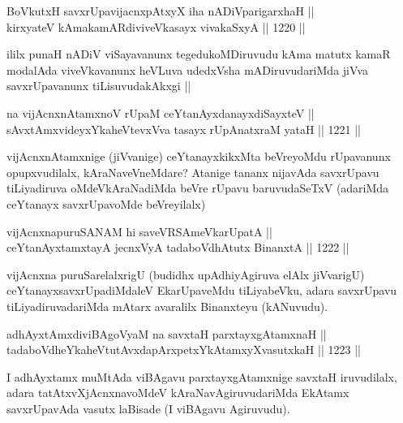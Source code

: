 
\begin{shl}
BoVkutxH savxrUpavijacnxpAtxyX iha nADiVparigarxhaH || \\
kirxyateV kAmakamARdiviveVkasayx vivakaSxyA \hfill || 1220 ||  
\end{shl}

\begin{artha}
ililx punaH nADiV viSayavanunx tegedukoMDiruvudu kAma matutx kamaR modalAda viveVkavanunx heVLuva udedxVsha mADiruvudariMda jiVva savxrUpavanunx tiLisuvudakAkxgi ||
\end{artha}


\begin{shl}
na vijAcnxnAtamxnoV rUpaM ceYtanAyxdanayxdiSayxteV || \\
sAvxtAmxvideyxYkaheVtevxVva tasayx rUpAnatxraM yataH \hfill || 1221 ||  
\end{shl}

\begin{artha}
vijAcnxnAtamxnige (jiVvanige) ceYtanayxkikxMta beVreyoMdu rUpavanunx opupxvudilalx, kAraNaveVneMdare? Atanige tananx nijavAda savxrUpavu tiLiyadiruva oMdeVkAraNadiMda beVre rUpavu baruvudaSeTxV (adariMda ceYtanayx savxrUpavoMde beVreyilalx)
\end{artha}

\begin{shl}
vijAcnxnapuruSANAM hi saveVRSAmeVkarUpatA || \\
ceYtanAyxtamxtayA jecnxVyA tadaboVdhAtutx BinanxtA \hfill || 1222 ||  
\end{shl}

\begin{artha}
vijAcnxna puruSarelalxrigU (budidhx upAdhiyAgiruva elAlx jiVvarigU) ceYtanayxsavxrUpadiMdaleV EkarUpaveMdu tiLiyabeVku, adara savxrUpavu tiLiyadiruvadariMda mAtarx avaralilx Binanxteyu (kANuvudu).
\end{artha}


\begin{shl}
adhAyxtAmxdiviBAgoV\s yaM na savxtaH parxtayxgAtamxnaH || \\
tadaboVdheYkaheVtutAvxdapArxpetxYkAtamxyXvasutxkaH \hfill || 1223 ||  
\end{shl}

\begin{artha}
I adhAyxtamx muMtAda viBAgavu parxtayxgAtamxnige savxtaH iruvudilalx, adara tatAtxvXjAcnxnavoMdeV kAraNavAgiruvudariMda EkAtamx savxrUpavAda vasutx laBisade (I viBAgavu Agiruvudu).
\end{artha}

